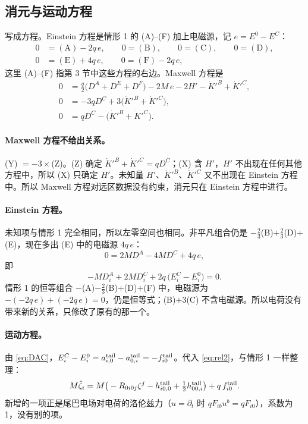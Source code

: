 \documentclass[11pt,a4paper]{ctexart}
\numberwithin{equation}{section}
\begin{document}
\subsection{消元与运动方程}

写成方程。Einstein 方程是情形 1 的 (A)--(F) 加上电磁源，记 $e=E^0-E^C$：
\begin{align}
0&=(\text{A})-2q\,e,\qquad 0=(\text{B}),\qquad 0=(\text{C}),\qquad 0=(\text{D}),\nonumber\\
0&=(\text{E})+4q\,e,\qquad 0=(\text{F})-2q\,e,\label{eq:L2E}
\end{align}
这里 (A)--(F) 指第 3 节中这些方程的右边。Maxwell 方程是
\begin{align}
0&=\tfrac q2\big(D^A+D^E+D^F\big)-2M\,e-2H'-\dot K'^B+\dot K'^C,\tag{X}\\
0&=-3qD^C+3\big(\dot K'^B+\dot K'^C\big),\tag{Y}\\
0&=qD^C-\big(\dot K'^B+\dot K'^C\big).\tag{Z}
\end{align}

\paragraph{Maxwell 方程不给出关系。}(Y) $=-3\times$(Z)。(Z) 确定 $\dot K'^B+\dot K'^C=qD^C$；(X) 含 $H'$，$H'$ 不出现在任何其他方程中，所以 (X) 只确定 $H'$。未知量 $H'$、$\dot K'^B$、$\dot K'^C$ 又不出现在 Einstein 方程中。所以 Maxwell 方程对远区数据没有约束，消元只在 Einstein 方程中进行。

\paragraph{Einstein 方程。}未知项与情形 1 完全相同，所以左零空间也相同。非平凡组合仍是 $-\tfrac23$(B)$+\tfrac23$(D)$+$(E)，现在多出 (E) 中的电磁源 $4q\,e$：
\begin{equation*}
0=2MD^A-4MD^C+4q\,e ,
\end{equation*}
即
\begin{equation}
-MD^A_i+2MD^C_i+2q\,\big(E^C_i-E^0_i\big)=0 .
\label{eq:rel2}
\end{equation}
情形 1 的恒等组合 $-$(A)$-\tfrac23$(B)$+$(D)$+$(F) 中，电磁源为 $-(-2q\,e)+(-2q\,e)=0$，仍是恒等式；(B)$+3$(C) 不含电磁源。所以电荷没有带来新的关系，只修改了原有的那一个。

\paragraph{运动方程。}由 \eqref{eq:DAC}，$E^C_i-E^0_i=a^{\rm tail}_{i,0}-a^{\rm tail}_{0,i}=-f^{\rm tail}_{i0}$。代入 \eqref{eq:rel2}，与情形 1 一样整理：
\begin{equation}
M\ddot\zeta_i=M\big(-R_{0i0j}\zeta^j-h^{\rm tail}_{i0,0}+\tfrac12h^{\rm tail}_{00,i}\big)+q\,f^{\rm tail}_{i0}.
\label{eq:eom2}
\end{equation}
新增的一项正是尾巴电场对电荷的洛伦兹力（$u=\partial_t$ 时 $qF_{ib}u^b=qF_{i0}$），系数为 1，没有别的项。
\end{document}
